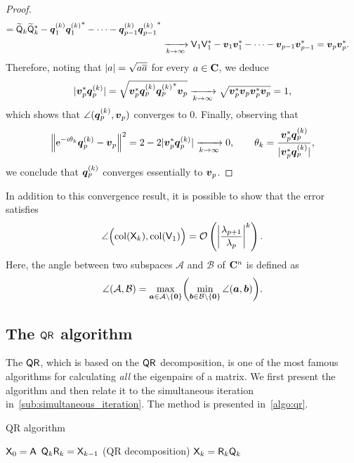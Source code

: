 \begin{proof}
\begin{align*}
        = \widetilde{\mat Q}_k \widetilde{\mat Q}_k^* - \vect q_1^{(k)} {\vect q_1^{(k)}}^* - \dotsb - \vect q_{p-1}^{(k)} {\vect q_{p-1}^{(k)}}^* \\
        &\xrightarrow[k \to \infty]{} \mat V_1 \mat V_1^* - \vect v_1 \vect v_1^* - \dotsb - \vect v_{p-1} \vect v_{p-1}^* = \vect v_p \vect v_p^{*}.
    \end{align*}
    Therefore, noting that $\abs{a} = \sqrt{a \overline a}$ for every $a \in \complex$,
    we deduce
    \[
        \abs{\vect v_p^* \vect q_p^{(k)}} = \sqrt{\vect v_p^* \vect q_p^{(k)} {\vect q_p^{(k)}}^* \vect v_p} \xrightarrow[k \to \infty]{} \sqrt{\vect v_p^* \vect v_p \vect v_p^* \vect v_p} = 1,
    \]
    which shows that $\angle(\vect q_p^{(k)}, \vect v_p)$ converges to 0.
    Finally, observing that
    \[
        \norm*{\e^{- i \theta_k}\vect q_p^{(k)} - \vect v_p}^2 = 2 - 2 \abs{\vect v_p^* \vect q_p^{(k)}} \xrightarrow[k \to \infty]{} 0, \qquad
        \theta_k = \frac{\vect v_p^* \vect q_p^{(k)}}{\abs{\vect v_p^* \vect q_p^{(k)}}},
    \]
    we conclude that $\vect q_p^{(k)}$ converges essentially to $\vect v_p$.
\end{proof}

In addition to this convergence result,
it is possible to show that the error satisfies
\[
    \angle \Bigl(\col(\mat X_k), \col(\mat V_1)\Bigr)
    = \mathcal O \left( \abs*{\frac{\lambda_{p+1}}{\lambda_p}}^k \right).
\]
Here,
the angle between two subspaces $\mathcal A$ and $\mathcal B$ of $\complex^n$ is defined as
\[
    \angle (\mathcal A, \mathcal B) = \max_{\vect a \in \mathcal A \backslash \{\vect 0\}} \biggl( \min_{\vect b \in \mathcal B \backslash \{\vect 0\}} \angle(\vect a, \vect b) \biggr).
\]

\subsection{The $\mat Q \mat R$ algorithm}
The $\mat Q \mat R$,
which is based on the $\mat Q \mat R$ decomposition,
is one of the most famous algorithms for calculating \emph{all} the eigenpairs of a matrix.
We first present the algorithm and then relate it to the simultaneous iteration in~\cref{sub:simultaneous_iteration}.
The method is presented in~\cref{algo:qr}.
\begin{algorithm}
\caption{QR algorithm}%
\label{algo:qr}%
\begin{algorithmic}
\State $\mat X_0 = \mat A$
    \State $\mat Q_k \mat R_k = \mat X_{k-1}$ (QR decomposition)
    \State $\mat X_{k} = \mat R_k \mat Q_k$
\EndFor
\end{algorithmic}
\end{algorithm}

